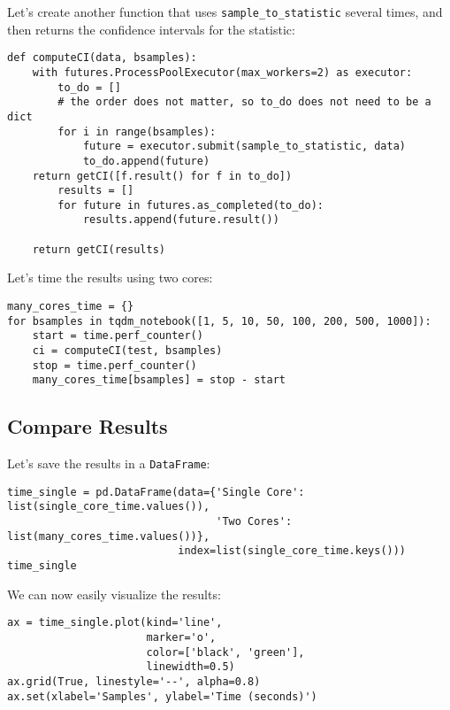 \documentclass[12pt, a4paper]{article}
\begin{document}
Let's create another function that uses \texttt{sample\_to\_statistic} several times, and then returns the confidence intervals for the statistic:
\lstset{language=jupyter-python,label= ,caption= ,captionpos=b,numbers=none}
\begin{lstlisting}
def computeCI(data, bsamples):
    with futures.ProcessPoolExecutor(max_workers=2) as executor:
        to_do = []
        # the order does not matter, so to_do does not need to be a dict
        for i in range(bsamples):
            future = executor.submit(sample_to_statistic, data)
            to_do.append(future)
    return getCI([f.result() for f in to_do])
        results = []
        for future in futures.as_completed(to_do):
            results.append(future.result())

    return getCI(results)
\end{lstlisting}

Let's time the results using two cores:
\lstset{language=jupyter-python,label= ,caption= ,captionpos=b,numbers=none}
\begin{lstlisting}
many_cores_time = {}
for bsamples in tqdm_notebook([1, 5, 10, 50, 100, 200, 500, 1000]):
    start = time.perf_counter()
    ci = computeCI(test, bsamples)
    stop = time.perf_counter()
    many_cores_time[bsamples] = stop - start
\end{lstlisting}

\subsection{Compare Results}
\label{sec:org1b8b8eb}
Let's save the results in a \texttt{DataFrame}:
\lstset{language=jupyter-python,label= ,caption= ,captionpos=b,numbers=none}
\begin{lstlisting}
time_single = pd.DataFrame(data={'Single Core': list(single_core_time.values()),
                                 'Two Cores': list(many_cores_time.values())},
                           index=list(single_core_time.keys()))
time_single
\end{lstlisting}

We can now easily visualize the results:
\lstset{language=jupyter-python,label= ,caption= ,captionpos=b,numbers=none}
\begin{lstlisting}
ax = time_single.plot(kind='line',
                      marker='o',
                      color=['black', 'green'],
                      linewidth=0.5)
ax.grid(True, linestyle='--', alpha=0.8)
ax.set(xlabel='Samples', ylabel='Time (seconds)')
\end{lstlisting}
\end{document}
